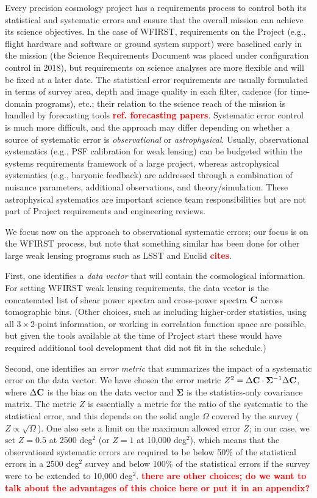 \documentclass[aps,prd, amsmath,amssymb,superscriptaddress,showkeys,nofootinbib,reprint,preprintnumbers]{revtex4-1}
\newcommand{\verify}[1]{\textcolor{red}{\textbf{{#1}}}}
\begin{document}
Every precision cosmology project has a requirements process to control both its statistical and systematic errors and ensure that the overall mission can achieve its science objectives. In the case of WFIRST, requirements on the Project (e.g., flight hardware and software or ground system support) were baselined early in the mission (the Science Requirements Document was placed under configuration control in 2018), but requirements on science analyses are more flexible and will be fixed at a later date. The statistical error requirements are usually formulated in terms of survey area, depth and image quality in each filter, cadence (for time-domain programs), etc.; their relation to the science reach of the mission is handled by forecasting tools \verify{ref. forecasting papers}. Systematic error control is much more difficult, and the approach may differ depending on whether a source of systematic error is {\em observational} or {\em astrophysical}. Usually, observational systematics (e.g., PSF calibration for weak lensing) can be budgeted within the systems requirements framework of a large project, whereas astrophysical systematics (e.g., baryonic feedback) are addressed through a combination of nuisance parameters, additional observations, and theory/simulation. These astrophysical systematics are important science team responsibilities but are not part of Project requirements and engineering reviews.

We focus now on the approach to observational systematic errors; our focus is on the WFIRST process, but note that something similar has been done for other large weak lensing programs such as LSST and Euclid \verify{cites}.

First, one identifies a {\em data vector} that will contain the cosmological information. For setting WFIRST weak lensing requirements, the data vector is the concatenated list of shear power spectra and cross-power spectra ${\bf C}$ across tomographic bins. (Other choices, such as including higher-order statistics, using all $3\times 2$-point information, or working in correlation function space are possible, but given the tools available at the time of Project start these would have required additional tool development that did not fit in the schedule.)

Second, one identifies an {\em error metric} that summarizes the impact of a systematic error on the data vector. We have chosen the error metric $Z^2 = \Delta{\bf C}\cdot{\boldsymbol\Sigma}^{-1}\Delta{\bf C}$, where $\Delta{\bf C}$ is the bias on the data vector and ${\boldsymbol\Sigma}$ is the statistics-only covariance matrix. The metric $Z$ is essentially a metric for the ratio of the systematic to the statistical error, and this depends on the solid angle $\Omega$ covered by the survey ($Z\propto \sqrt\Omega$). One also sets a limit on the maximum allowed error $Z$; in our case, we set $Z=0.5$ at 2500 deg$^2$ (or $Z=1$ at 10,000 deg$^2$), which means that the observational systematic errors are required to be below 50\% of the statistical errors in a 2500 deg$^2$ survey and below 100\% of the statistical errors if the survey were to be extended to 10,000 deg$^2$. \verify{there are other choices; do we want to talk about the advantages of this choice here or put it in an appendix?}
\end{document}
